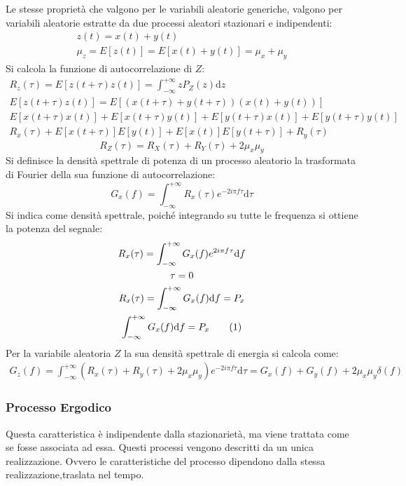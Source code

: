 \documentclass{article}
\newcommand{\df}{\mathrm{d}}
\newcommand{\intinf}{\displaystyle\int_{-\infty}^{+\infty}}
\newcommand{\tageq}{\tag{\stepcounter{equation}\theequation}}
\numberwithin{equation}{subsection}
\begin{document}
Le stesse proprietà che valgono per le variabili aleatorie generiche, valgono per variabili aleatorie estratte da due processi aleatori stazionari e indipendenti:
\begin{gather*}
    z(t)=x(t)+y(t)\\
    \mu_z=E[z(t)]=E[x(t)+y(t)]=\mu_x+\mu_y
\end{gather*}
Si calcola la funzione di autocorrelazione di $Z$:
\begin{gather*}
    R_z(\tau)=E[z(t+\tau)z(t)]=\displaystyle\int_{-\infty}^{+\infty}zP_Z(z)\df z\\
    E[z(t+\tau)z(t)]=E[(x(t+\tau)+y(t+\tau))(x(t)+y(t))]\\
    E[x(t+\tau)x(t)]+E[x(t+\tau)y(t)]+E[y(t+\tau)x(t)]+E[y(t+\tau)y(t)]\\
    R_x(\tau)+E[x(t+\tau)]E[y(t)]+E[x(t)]E[y(t+\tau)]+R_y(\tau)
\end{gather*}
\begin{equation}
    R_Z(\tau)=R_X(\tau)+R_Y(\tau)+2\mu_x\mu_y
\end{equation}
Si definisce la densità spettrale di potenza di un processo aleatorio la trasformata di Fourier della sua funzione di autocorrelazione:
\begin{equation}
    G_x(f)=\intinf R_x(\tau)e^{-2i\pi f\tau}\df\tau
\end{equation}
Si indica come densità spettrale, poiché integrando su tutte le frequenza si ottiene la potenza del segnale:
\begin{gather*}
    R_x(\tau)=\intinf G_x(f)e^{2i\pi f\tau}\df f\\
    \tau=0\\
    R_x(\tau)=\intinf G_x(f)\df f=P_x\\
    \intinf G_x(f)\df f=P_x\tageq
\end{gather*}
Per la variabile aleatoria $Z$ la sua densità spettrale di energia si calcola come:
\begin{gather}
    G_z(f)=\int_{-\infty}^{+\infty}\left(R_x(\tau)+R_y(\tau)+2\mu_x\mu_y\right)e^{-2i\pi f\tau}\df \tau=G_x(f)+G_y(f)+2\mu_x\mu_y\delta(f)
\end{gather}

\subsubsection{Processo Ergodico}

Questa caratteristica è indipendente dalla stazionarietà, ma viene trattata come se fosse associata ad essa. 
Questi processi vengono descritti da un unica realizzazione. Ovvero le caratteristiche del processo dipendono dalla stessa realizzazione,traslata nel tempo. 
\end{document}
